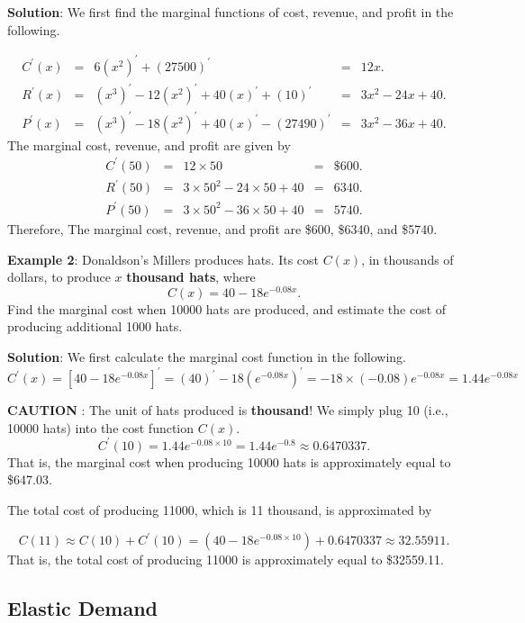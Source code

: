 \documentclass[
]{book}
\begin{document}
\textbf{Solution}: We first find the marginal functions of cost, revenue, and profit in the following.

\[
\begin{array}{lclcl}
C^\prime(x) & = & 6(x^2)^\prime + (27500)^\prime & = & 12x. \\
R^\prime(x) & = & (x^3)^\prime - 12(x^2)^\prime + 40(x)^\prime + (10)^\prime & = & 3x^2-24x + 40.\\
P^\prime(x) & = & (x^3)^\prime -18(x^2)^\prime + 40(x)^\prime -(27490)^\prime & = &3x^2 - 36x + 40.
\end{array}
\]
The marginal cost, revenue, and profit are given by
\[
\begin{array}{lclcl}
C^\prime(50) & = & 12\times 50 & = & \textit{\$}600. \\
R^\prime(50) & = & 3\times 50^2-24\times 50 + 40 & = & 6340.\\
P^\prime(50) & = &3\times 50^2 - 36\times 50 + 40 & = & 5740.
\end{array}
\]
Therefore, The marginal cost, revenue, and profit are \$600, \$6340, and \$5740.

\hfill\break

\textbf{Example 2}: Donaldson's Millers produces hats. Its cost \(C(x)\), in thousands of dollars, to produce \(x\) \textbf{thousand hats}, where
\[
C(x) = 40 - 18e^{-0.08x}.
\]
Find the marginal cost when 10000 hats are produced, and estimate the cost of producing additional 1000 hats.

\textbf{Solution}: We first calculate the marginal cost function in the following.
\[
C^\prime(x) = [40 - 18e^{-0.08x}]^\prime = (40)^\prime - 18(e^{-0.08x})^\prime = -18\times (-0.08)e^{-0.08x} = 1.44e^{-0.08x}
\]

\textbf{\color{red}CAUTION} : The unit of hats produced is \textbf{thousand}! We simply plug 10 (i.e., 10000 hats) into the cost function \(C(x)\).
\[
C^\prime(10) = 1.44e^{-0.08\times 10} = 1.44e^{-0.8} \approx 0.6470337.
\]
That is, the marginal cost when producing 10000 hats is approximately equal to \$647.03.

The total cost of producing 11000, which is 11 thousand, is approximated by

\[
C(11) \approx C(10) + C^\prime(10) = (40 - 18e^{-0.08\times 10}) + 0.6470337  \approx 32.55911.
\]
That is, the total cost of producing 11000 is approximately equal to \$32559.11.

\hfill\break

\hypertarget{elastic-demand}{%
\subsection{Elastic Demand}\label{elastic-demand}}
\end{document}

